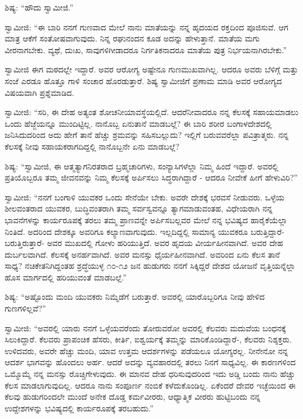  ಶಿಷ್ಯ: “ಹೌದು ಸ್ವಾಮೀಜಿ.” 

\newpage

 ಸ್ವಾಮೀಜಿ: “ಈ ಬಾರಿ ನನಗೆ ಗುಣವಾದ ಮೇಲೆ ನಾನು ಮಾತೆಯನ್ನು ನನ್ನ ಹೃದಯದ ರಕ್ತದಿಂದ ಪೂಜಿಸುವೆ. ಆಗ ಮಾತ್ರ ಆಕೆಗೆ ಸಂತೋಷವಾಗುವುದು. ನಿನ್ನ ರಘುನಂದನ ಕೂಡ ಅದನ್ನು ಹೇಳುತ್ತಾನೆ. ಮಾತೆಯ ಮಗು ವೀರನಾಗಬೇಕು. ವ್ಯಥೆ, ದುಃಖ, ಸಾವುಗಳಿಗೀಡಾದರೂ ನಿರ್ಗತಿಕನಾದರೂ ಮಾತೆಯ ಪುತ್ರ ನಿರ್ಭಯನಾಗಿರಬೇಕು.” 

 ಸ್ವಾಮೀಜಿ ಈಗ ಮಠದಲ್ಲೇ ಇದ್ದಾರೆ. ಅವರ ಆರೋಗ್ಯ ಅಷ್ಟೇನೂ ಗುಣಮುಖವಾಗಿಲ್ಲ. ಆದರೂ ಅವರು ಬೆಳಿಗ್ಗೆ ಮತ್ತು ಸಂಜೆ ಎರಡೂ ಹೊತ್ತೂ ಗಾಳಿ ಸಂಚಾರ ಹೊರಡುತ್ತಾರೆ. ಶಿಷ್ಯ ಸ್ವಾಮೀಜಿಗೆ ಪ್ರಣಾಮ ಮಾಡಿ ಅವರ ಆರೋಗ್ಯದ ವಿಷಯವಾಗಿ ಪ್ರಶ್ನೆಮಾಡಿದ. 

 ಸ್ವಾಮೀಜಿ: “ಸರಿ, ಈ ದೇಹ ಅತ್ಯಂತ ಶೋಚನೀಯಾವಸ್ಥೆಯಲ್ಲಿದೆ. ಆದರೆ\break ನೀವಾದರೂ ನನ್ನ ಕೆಲಸಕ್ಕೆ ಸಹಾಯಮಾಡಲು ಒಂದು ಹೆಜ್ಜೆಯನ್ನೂ ಮುಂದಿಟ್ಟಿಲ್ಲ. ನಾನೊಬ್ಬ ಏನುತಾನೆ ಮಾಡಬಲ್ಲೆ? ಈ ಬಾರಿ ಶರೀರ ಬಂಗಾಳದೇಶದಲ್ಲಿ ಜನಿಸಿದುದರಿಂದ ಅದು ಹೇಗೆ ತಾನೆ ಹೆಚ್ಚು ಶ್ರಮವನ್ನು ಸಹಿಸಬಲ್ಲುದು? ಇಲ್ಲಿಗೆ ಬರುವವರೆಲ್ಲಾ ಪವಿತ್ರಾತ್ಮರು. ನನ್ನ ಕೆಲಸಕ್ಕೆ ನೀವು ಸಹಾಯಕರಾಗದಿದ್ದಲ್ಲಿ ನಾನೊಬ್ಬನೇ ಏನು ಮಾಡಬಲ್ಲೆ? 

 ಶಿಷ್ಯ: “ಸ್ವಾಮೀಜಿ, ಈ ಆತ್ಮತ್ಯಾಗನಿರತರಾದ ಬ್ರಹ್ಮಚಾರಿಗಳು, ಸಂನ್ಯಾಸಿಗಳೆಲ್ಲಾ ನಿಮ್ಮ ಹಿಂದೆ ಇದ್ದಾರೆ. ಅವರಲ್ಲಿ ಪ್ರತಿಯೊಬ್ಬರೂ ತಮ್ಮ ಜೀವನವನ್ನು ನಿಮ್ಮ ಕೆಲಸಕ್ಕೆ ಅರ್ಪಿಸಲು ಸಿದ್ಧರಾಗಿದ್ದಾರೆ - ಆದರೂ ನೀವೇಕೆ ಹೀಗೆ ಹೇಳುವಿರಿ?” 

 ಸ್ವಾಮೀಜಿ: “ನನಗೆ ಬಂಗಾಳಿ ಯುವಕರ ಒಂದು ಸೇನೆಯೇ ಬೇಕು. ಅವರೇ ದೇಶಕ್ಕೆ ಭರವಸೆ ನೀಡುವರು. ಒಳ್ಳೆಯ ಶೀಲವಂತರಾದ ಯುವಕರ, ಬುದ್ಧಿವಂತರಾಗಿ ತಮ್ಮ ಸರ್ವಸ್ವವನ್ನೂ ತ್ಯಾಗಮಾಡುವಂತಹ, ವಿಧೇಯರಾಗಿ ನನ್ನ ಭಾವನೆಗಳನ್ನು ಕಾರ್ಯರೂಪಕ್ಕೆ ತರಲು ತಮ್ಮ ಪ್ರಾಣವನ್ನೇ ಅರ್ಪಿಸಬಲ್ಲವರ ಮೇಲೆ ನನ್ನ ಭವಿಷ್ಯದ ಹಾರೈಕೆಯೆಲ್ಲಾ ನಿಂತಿದೆ. ಅದರಿಂದ ದೇಶಕ್ಕೂ ಅವರಿಗೂ ಕಲ್ಯಾಣವಾಗುವುದು. ಇಲ್ಲದಿದ್ದಲ್ಲಿ ಸಾಮಾನ್ಯ ಯುವಕರೂ ಬರುತ್ತಿದ್ದಾರೆ- ಬರುತ್ತಿರುತ್ತಾರೆ- ಅವರ ಮುಖದಲ್ಲಿ ಗೋಳು ಹರಿಯುತ್ತಿದೆ. ಅವರ ಹೃದಯ ವೀರ್ಯಹೀನವಾಗಿದೆ. ಅವರ ದೇಹ ದುರ್ಬಲವಾಗಿದೆ. ಕೆಲಸಕ್ಕೆ ಅನರ್ಹವಾಗಿದೆ. ಅವರ ಮನಸ್ಸು ಧೈರ್ಯಹೀನವಾಗಿದೆ. ಅವರಿಂದ ಏನು ಕೆಲಸ ತಾನೆ ಸಾಧ್ಯ? ನಚಿಕೇತನಿಗಿದ್ದಂತಹ ಶ್ರದ್ಧೆಯುಳ್ಳ ೧೦-೧೨ ಜನ ಹುಡುಗರು ನನಗೆ ಸಿಕ್ಕಿದ್ದರೆ ದೇಶದ ಯೋಜನೆ ವೃತ್ತಿಯನ್ನೆಲ್ಲಾ ಹೊಸ ಮಾರ್ಗದಲ್ಲಿ ಹರಿಯುವಂತೆ ಮಾಡಬಲ್ಲೆ.” 

 ಶಿಷ್ಯ: “ಅಷ್ಟೊಂದು ಮಂದಿ ಯುವಕರು ನಿಮ್ಮೆಡೆಗೆ ಬರುತ್ತಾರೆ. ಅವರಲ್ಲಿ ಯಾರೊಬ್ಬರಿಗೂ ನೀವು ಹೇಳಿದ ಗುಣಗಳಿಲ್ಲವೆ?” 

\newpage

 ಸ್ವಾಮೀಜಿ: “ಅವರಲ್ಲಿ ಯಾರು ನನಗೆ ಒಳ್ಳೆಯವರೆಂದು ತೋರುವರೋ ಅವರಲ್ಲಿ ಕೆಲವರು ಮದುವೆಯ ಬಂಧನಕ್ಕೆ ಸಿಲುಕಿದ್ದಾರೆ. ಕೆಲವರು ಪ್ರಾಪಂಚಿಕ ಹೆಸರು, ಕೀರ್ತಿ, ಐಶ್ವರ್ಯಕ್ಕೆ ತಮ್ಮನ್ನು ಮಾರಿಕೊಂಡಿದ್ದಾರೆ-, ಕೆಲವರು ನಿಶ್ಶಕ್ತರು. ಉಳಿದವರು, ಅವರೇ ಹೆಚ್ಚು ಮಂದಿ, ಯಾವ ಉತ್ತಮ ಆದರ್ಶಗಳನ್ನು ಪಡೆಯಲೂ ಯೋಗ್ಯರಲ್ಲ. ನೀನೇನೋ ನನ್ನ ಆದರ್ಶ ಭಾಗವನ್ನು ಹೊಂದಲು ಅರ್ಹ. ಆದರೆ ಅದನ್ನು ವ್ಯವಹಾರದಲ್ಲಿ ತರಲು ನಿನಗೆ ಸಾಧ್ಯವಿಲ್ಲ. ಈ ಕಾರಣಗಳಿಂದ ಒಮ್ಮೊಮ್ಮೆ ನನ್ನ ಮನಸ್ಸು ರೊಚ್ಚಿಗೇಳುವುದು. ಈ ಮಾನವ ದೇಹ ಧರಿಸುವುದರಿಂದ ಇದು ಅಡ್ಡಿ ಬಂದು ನಾನು ಹೆಚ್ಚು ಕೆಲಸ ಮಾಡಲಾಗುವುದಿಲ್ಲ. ಆದರೂ ನಾನು ಸಂಪೂರ್ಣ ನಂಬಿಕೆ ಕಳೆದುಕೊಂಡಿಲ್ಲ. ಏಕೆಂದರೆ ದೇವರ ಇಚ್ಛೆಯಿಂದ ಈ ಕೆಲವು ಹುಡುಗರಿಂದಲೇ ಮುಂದೆ ಅನೇಕ ದೊಡ್ಡ ಕರ್ಮವೀರರು, ಆಧ್ಯಾತ್ಮಿಕ ವೀರರು ಹುಟ್ಟಿಬಂದು ನನ್ನ ಉದ್ದೇಶಗಳನ್ನು ಭವಿಷ್ಯದಲ್ಲಿ ಕಾರ್ಯರೂಪಕ್ಕೆ ತರಬಹುದು.” 

